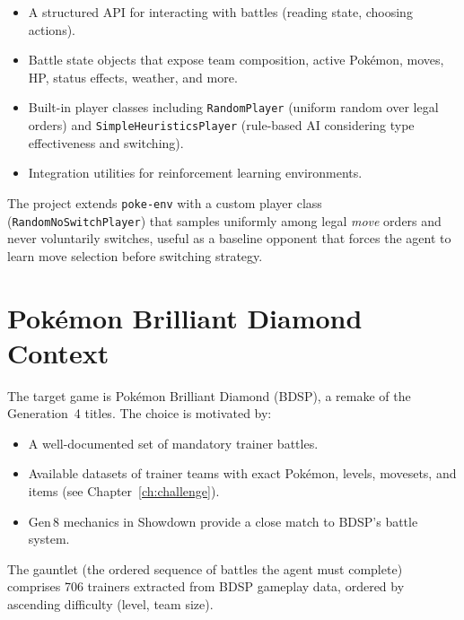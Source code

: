 \begin{itemize}
  \item A structured API for interacting with battles (reading state,
        choosing actions).
  \item Battle state objects that expose team composition, active Pok\'{e}mon,
        moves, HP, status effects, weather, and more.
  \item Built-in player classes including \texttt{RandomPlayer} (uniform
        random over legal orders) and \texttt{SimpleHeuristicsPlayer}
        (rule-based AI considering type effectiveness and switching).
  \item Integration utilities for reinforcement learning environments.
\end{itemize}

The project extends \texttt{poke-env} with a custom player class
(\texttt{RandomNoSwitchPlayer}) that samples uniformly among legal \emph{move}
orders and never voluntarily switches, useful as a baseline opponent that
forces the agent to learn move selection before switching strategy.

\section{Pok\'{e}mon Brilliant Diamond Context}

The target game is Pok\'{e}mon Brilliant Diamond (BDSP), a remake of the
Generation~4 titles.  The choice is motivated by:

\begin{itemize}
  \item A well-documented set of mandatory trainer battles.
  \item Available datasets of trainer teams with exact Pok\'{e}mon, levels,
        movesets, and items (see Chapter~\ref{ch:challenge}).
  \item Gen\,8 mechanics in Showdown provide a close match to BDSP's battle
        system.
\end{itemize}

The gauntlet (the ordered sequence of battles the agent must
complete) comprises 706 trainers extracted from BDSP gameplay data, ordered
by ascending difficulty (level, team size).
